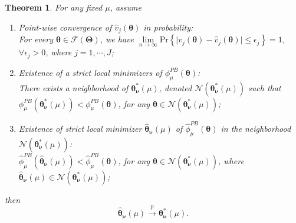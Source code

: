 \documentclass{article}
\newcommand{\wh}{\widehat}
\newcommand{\itl}{\intercal}
\newcommand{\bs}{ \boldsymbol}
\newcommand{\ml}{\mathcal}
\newcommand{\lt}{\left}
\newcommand{\rt}{\right}
\newtheorem{theorem}{Theorem}[section]
\begin{document}

\begin{theorem}
For any fixed $\mu$, assume 
\begin{enumerate}
\item Point-wise convergence of $\wh{v}_j(\bs{\theta})$ in probability:\\ For every $ \bs{\theta} \in \ml{F}(\bs{\Theta})$, we have $ \underset{n \to \infty}{\lim} \text{Pr} \lt\{ \mid v_j(\bs{\theta}) - \wh{v}_j(\bs{\theta}) \mid \le \epsilon_j \rt\}  = 1$, $\forall \epsilon_j > 0$, where $j = 1, \cdots, J$;
\item Existence of a strict local minimizers of $\phi^{PB}_{\mu}\lt(\bs{\theta}\rt)$:\\
 There exists a neighborhood of $\bs{\theta}^{*}_{\bs{\nu}}(\mu)$, denoted $\ml{N}\lt(\bs{\theta}^{*}_{\bs{\nu}}(\mu)\rt)$ such that $\phi^{PB}_{\mu}\lt(\bs{\theta}^{*}_{\bs{\nu}}(\mu)\rt) < \phi^{PB}_{\mu}\lt(\bs{\theta}\rt)$, for any $\bs{\theta} \in \ml{N}\lt(\bs{\theta}^{*}_{\bs{\nu}}(\mu)\rt)$;
\item Existence of strict local minimizer $\wh{\bs{\theta}}_{\bs{\nu}}(\mu)$ of $\wh{\phi}^{PB}_{\mu}\lt(\bs{\theta}\rt)$ in the neighborhood $\ml{N}\lt(\bs{\theta}^{*}_{\bs{\nu}}(\mu)\rt)$:\\  
$ \wh{\phi}^{PB}_{\mu}\lt(\wh{\bs{\theta}}_{\bs{\nu}}(\mu)\rt) < \wh{\phi}^{PB}_{\mu}\lt(\bs{\theta}\rt)$, for any $\bs{\theta} \in \ml{N}\lt(\bs{\theta}^{*}_{\bs{\nu}}(\mu)\rt)$, where $\wh{\bs{\theta}}_{\bs{\nu}}(\mu) \in \ml{N}\lt(\bs{\theta}^{*}_{\bs{\nu}}(\mu)\rt)$;
\end{enumerate} then 
$$\wh{\bs{\theta}}_{\bs{\nu}}(\mu) \overset{p}{\to} \bs{\theta}^{*}_{\bs{\nu}}(\mu).$$

\end{theorem}
\end{document}

